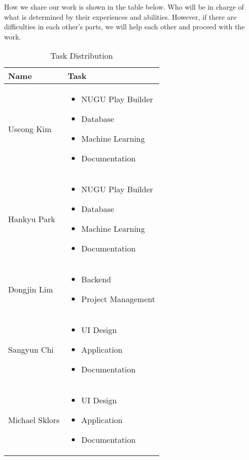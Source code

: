 \documentclass[conference]{IEEEtran}
\begin{document}
How we share our work is shown in the table below. Who will be in charge of what is determined by their experiences and abilities. However, if there are difficulties in each other's parts, we will help each other and proceed with the work.

\begin{table}[H]
\caption{Task Distribution}
\begin{center}
\begin{tabular}{|p{1.5cm}|p{5cm}|}
\hline
\textbf{Name} & \textbf{Task} \\
\hline
Useong Kim & 
\begin{itemize}
\item NUGU Play Builder
\item Database
\item Machine Learning
\item Documentation
\end{itemize}
 \\
\hline
Hankyu Park	& 
\begin{itemize}
\item NUGU Play Builder
\item Database
\item Machine Learning
\item Documentation
\end{itemize}
 \\
\hline
Dongjin Lim & 
\begin{itemize}
\item Backend
\item Project Management
\end{itemize}
 \\
\hline
Sangyun Chi	& 
\begin{itemize}
\item UI Design
\item Application
\item Documentation
\end{itemize}
 \\
\hline
Michael Sklors & 
\begin{itemize}
\item UI Design
\item Application
\item Documentation
\end{itemize}
\\
\hline
\end{tabular}
\end{center}
\end{table}
\end{document}
